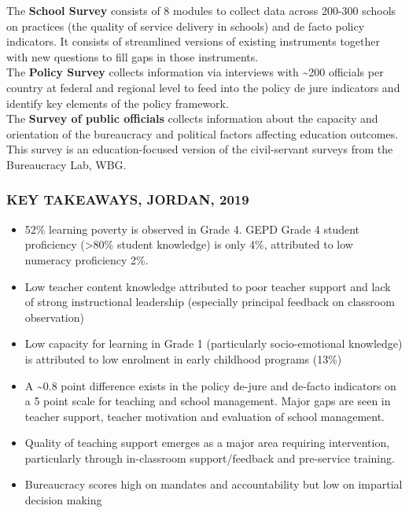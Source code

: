 \documentclass[twocolumn]{article}
\providecommand{\tightlist}{%
  \setlength{\itemsep}{0pt}\setlength{\parskip}{0pt}}
\begin{document}
The \textbf{School Survey} consists of 8 modules to collect data across
200-300 schools on practices (the quality of service delivery in
schools) and de facto policy indicators. It consists of streamlined
versions of existing instruments together with new questions to fill
gaps in those instruments.\\
The \textbf{Policy Survey} collects information via interviews with
\textasciitilde{}200 officials per country at federal and regional level
to feed into the policy de jure indicators and identify key elements of
the policy framework.\\
The \textbf{Survey of public officials} collects information about the
capacity and orientation of the bureaucracy and political factors
affecting education outcomes. This survey is an education-focused
version of the civil-servant surveys from the Bureaucracy Lab, WBG.

\hypertarget{key-takeaways-2019}{%
\subsubsection{\texorpdfstring{\textbf{KEY TAKEAWAYS,
\uppercase{Jordan},
2019}}{KEY TAKEAWAYS, , 2019}}\label{key-takeaways-2019}}

\begin{itemize}
\tightlist
\item
  52\% learning poverty is observed in Grade 4. GEPD Grade 4 student
  proficiency (\textgreater{}80\% student knowledge) is only 4\%,
  attributed to low numeracy proficiency 2\%.
\item
  Low teacher content knowledge attributed to poor teacher support and
  lack of strong instructional leadership (especially principal feedback
  on classroom observation)
\item
  Low capacity for learning in Grade 1 (particularly socio-emotional
  knowledge) is attributed to low enrolment in early childhood programs
  (13\%)
\item
  A \textasciitilde{}0.8 point difference exists in the policy de-jure
  and de-facto indicators on a 5 point scale for teaching and school
  management. Major gaps are seen in teacher support, teacher motivation
  and evaluation of school management.
\item
  Quality of teaching support emerges as a major area requiring
  intervention, particularly through in-classroom support/feedback and
  pre-service training.
\item
  Bureaucracy scores high on mandates and accountability but low on
  impartial decision making
\end{itemize}
\end{document}
